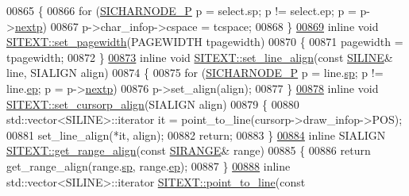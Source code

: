 \begin{DoxyCode}
00865 \{
00866     \textcolor{keywordflow}{for} (\hyperlink{class_s_i_c_h_a_r_n_o_d_e}{SICHARNODE\_P} p = select.sp; p != select.ep; p = p->\hyperlink{class_s_i_c_h_a_r_n_o_d_e_ab188ae5c7731bcc66a1042defcf158c8}{nextp})
00867         p->char\_infop->cspace = tcspace;
00868 \}
\hyperlink{class_s_i_t_e_x_t_a324e28153c8ebfeb4cabc3b82171c5e5}{00869} \textcolor{keyword}{inline} \textcolor{keywordtype}{void} \hyperlink{class_s_i_t_e_x_t_a324e28153c8ebfeb4cabc3b82171c5e5}{SITEXT::set\_pagewidth}(PAGEWIDTH tpagewidth)
00870 \{
00871     pagewidth = tpagewidth;
00872 \}
\hyperlink{class_s_i_t_e_x_t_ac0de66d8174d426e6b90641f36c6f74c}{00873} \textcolor{keyword}{inline} \textcolor{keywordtype}{void} \hyperlink{class_s_i_t_e_x_t_ac0de66d8174d426e6b90641f36c6f74c}{SITEXT::set\_line\_align}(\textcolor{keyword}{const} \hyperlink{struct_s_i_r_a_n_g_e}{SILINE}& line, SIALIGN align)
00874 \{
00875     \textcolor{keywordflow}{for} (\hyperlink{class_s_i_c_h_a_r_n_o_d_e}{SICHARNODE\_P} p = line.\hyperlink{struct_s_i_r_a_n_g_e_a7acdf296d873d6ed6fc203674109b715}{sp}; p != line.\hyperlink{struct_s_i_r_a_n_g_e_aaa89b5ae16be7b890eba048bc212feec}{ep}; p = p->\hyperlink{class_s_i_c_h_a_r_n_o_d_e_ab188ae5c7731bcc66a1042defcf158c8}{nextp})
00876         p->set\_align(align);
00877 \}
\hyperlink{class_s_i_t_e_x_t_a1717bc1a3f8d797fc52654ffb7aafb87}{00878} \textcolor{keyword}{inline} \textcolor{keywordtype}{void} \hyperlink{class_s_i_t_e_x_t_a1717bc1a3f8d797fc52654ffb7aafb87}{SITEXT::set\_cursorp\_align}(SIALIGN align)
00879 \{
00880     std::vector<SILINE>::iterator it = point\_to\_line(cursorp->draw\_infop->POS);
00881     set\_line\_align(*it, align);
00882     \textcolor{keywordflow}{return};
00883 \}
\hyperlink{class_s_i_t_e_x_t_a53c41b86be047c49946fab50ef79563b}{00884} \textcolor{keyword}{inline} SIALIGN \hyperlink{class_s_i_t_e_x_t_a43b43ba8dc025b49555f527734508465}{SITEXT::get\_range\_align}(\textcolor{keyword}{const} \hyperlink{struct_s_i_r_a_n_g_e}{SIRANGE}& range)
00885 \{
00886     \textcolor{keywordflow}{return} get\_range\_align(range.\hyperlink{struct_s_i_r_a_n_g_e_a7acdf296d873d6ed6fc203674109b715}{sp}, range.\hyperlink{struct_s_i_r_a_n_g_e_aaa89b5ae16be7b890eba048bc212feec}{ep});
00887 \}
\hyperlink{class_s_i_t_e_x_t_afe20f1a6f5380d4d6cb005e872980289}{00888} \textcolor{keyword}{inline} std::vector<SILINE>::iterator \hyperlink{class_s_i_t_e_x_t_afe20f1a6f5380d4d6cb005e872980289}{SITEXT::point\_to\_line}(\textcolor{keyword}{const} 

\end{DoxyCode}
